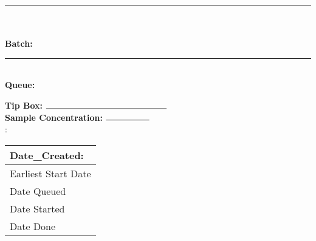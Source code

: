 \documentclass[11pt,a4paper]{memoir}
\begin{document}
	\noindent
	\rule{\textwidth}{.3mm}\\

    \noindent\textbf{\Huge{}}\\
    \Large{ \hfill \textbf{Batch: }}\\
    \rule{\textwidth}{.3mm}\\
    \normalsize{\textbf{Queue:} }
	\vspace{3mm}

	\begin{minipage}[t]{\textwidth}
	    \begin{minipage}[t]{0.4\textwidth}
		    \strut\vspace*{-\baselineskip}\newline
			\textbf{Tip Box:} $\rule{5cm}{0.15mm}$ \\

			\textbf{Sample Concentration:} $\rule{1.8cm}{0.15mm}$ \\

				\textbf{}:  \\
	    \end{minipage}
	    \begin{minipage}[t]{0.15\textwidth}
	    		\small
		    \strut\vspace*{-\baselineskip}\newline
	    		\begin{tabular}{|p{\textwidth}|}
	    		 \hline
	    		 Date\_Created: \textbf{\VAR{Date}}\\
				 \hline
	    		 {\color{lightgray}Earliest Start Date}\\
	    		 \hline    		 
	    		 {\color{lightgray}Date Queued}\\
	    		 \hline
	    		 {\color{lightgray}Date Started}\\
	    		 \hline
	    		 {\color{lightgray}Date Done}\\
	    		 \hline
	    		\end{tabular}\\
	    \end{minipage}
	    	\vspace{1mm} \\
    \end{minipage}
\end{document}
